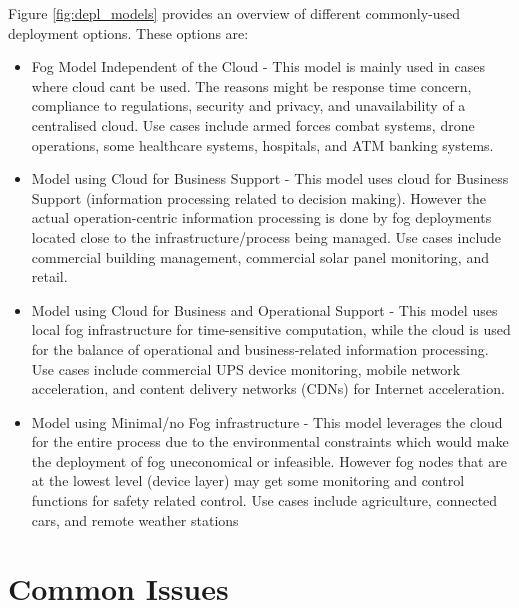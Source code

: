 \documentclass{article}
\begin{document}
Figure \ref{fig:depl_models} provides an overview of different commonly-used deployment options. These options are:

\begin{itemize}
	\item Fog Model Independent of the Cloud - This model is mainly used in cases where cloud cant be used. The reasons might be response time concern, compliance to regulations, security and privacy, and unavailability of a centralised cloud. 
	Use cases include armed forces combat systems, drone operations, some healthcare systems, hospitals, and ATM banking systems\cite{openfogconsortium2017}.

	\item Model using Cloud for Business Support - This model uses cloud for Business Support (information processing related to decision making).  However the actual operation-centric information processing is done by fog deployments located close to the infrastructure/process being managed.
	Use cases include commercial building management, commercial solar panel monitoring, and retail\cite{openfogconsortium2017}.

	\item Model using Cloud for Business and Operational Support - This model uses local fog infrastructure for time-sensitive computation, while the cloud is used for the balance of operational and business-related information processing.    
	Use cases include commercial UPS device monitoring, mobile network acceleration, and content delivery networks (CDNs) for Internet acceleration\cite{openfogconsortium2017}.

	\item Model using Minimal/no Fog infrastructure - This model leverages the cloud for the entire process due to the environmental constraints which would make the deployment of fog uneconomical or infeasible. 
	However fog nodes that are at the lowest level (device layer) may get some monitoring and control functions for safety related control.
	Use cases include agriculture, connected cars, and remote weather stations\cite{openfogconsortium2017}
\end{itemize}


\pagebreak

\section{Common Issues}
\end{document}
